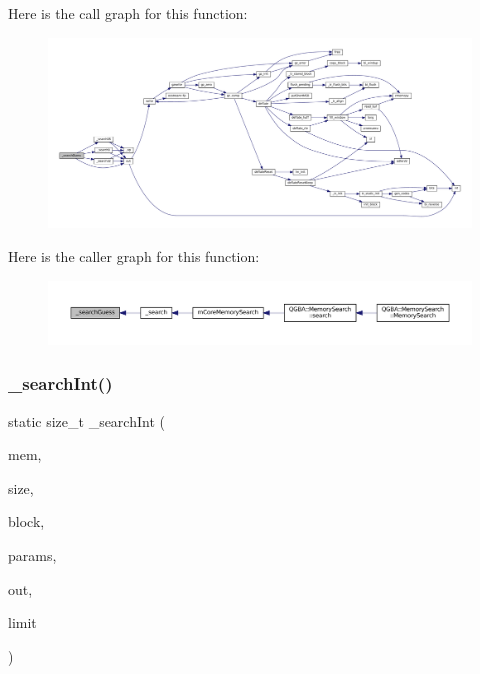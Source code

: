 Here is the call graph for this function\+:
\nopagebreak
\begin{figure}[H]
\begin{center}
\leavevmode
\includegraphics[width=350pt]{mem-search_8c_ac36aa4ea5ca988f0991caaf901aaf916_cgraph}
\end{center}
\end{figure}
Here is the caller graph for this function\+:
\nopagebreak
\begin{figure}[H]
\begin{center}
\leavevmode
\includegraphics[width=350pt]{mem-search_8c_ac36aa4ea5ca988f0991caaf901aaf916_icgraph}
\end{center}
\end{figure}
\mbox{\label{mem-search_8c_a1af85652c37edd16f2558ee8b15a4a9f}} 
\subsubsection{\texorpdfstring{\+\_\+search\+Int()}{\_searchInt()}}
{\footnotesize\ttfamily static size\+\_\+t \+\_\+search\+Int (\begin{DoxyParamCaption}\item[{const void $\ast$}]{mem,  }\item[{size\+\_\+t}]{size,  }\item[{const struct m\+Core\+Memory\+Block $\ast$}]{block,  }\item[{const struct m\+Core\+Memory\+Search\+Params $\ast$}]{params,  }\item[{struct m\+Core\+Memory\+Search\+Results $\ast$}]{out,  }\item[{size\+\_\+t}]{limit }\end{DoxyParamCaption})\hspace{0.3cm}{\ttfamily [static]}}


